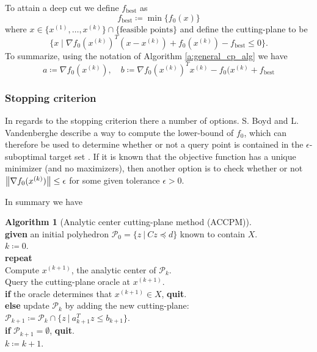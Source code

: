 \documentclass[11pt]{amsart}
\theoremstyle{definition}
\newtheorem{algorithm}{Algorithm}
\theoremstyle{remark}
\newcommand{\ind}{\hspace*{0.5cm}}
\newcommand{\transpose}{T}
\begin{document}
        To attain a deep cut we define $f_\text{best}$ as
        \begin{equation*}
            f_\text{best} \coloneqq \min \{f_0(x)\}
        \end{equation*}
        where $x \in \{x^{(1)}, \dots, x^{(k)}\} \cap \{\text{feasible points}\}$ and define the cutting-plane to be
        \begin{equation*}
            \{x \;|\; \nabla f_0(x^{(k)})^\transpose(x-x^{(k)}) + f_0(x^{(k)}) - f_\text{best} \leq 0\}.
        \end{equation*}
        To summarize, using the notation of Algorithm \ref{a:general_cp_alg} we have
        \begin{equation}
            a \coloneqq \nabla f_0(x^{(k)}), \quad b \coloneqq \nabla f_0(x^{(k)})^\transpose x^{(k)} - f_0(x^{(k)} + f_\text{best}
        \end{equation}

        \subsubsection*{Stopping criterion}
        In regards to the stopping criterion there a number of options. S. Boyd and L. Vandenberghe describe a way to compute the lower-bound of $f_0$, which can therefore be used to determine whether or not a query point is contained in the $\epsilon$-suboptimal target set \cite[Section 7]{BV11}. If it is known that the objective function has a unique minimizer (and no maximizers), then another option is to check whether or not $\norm{\nabla f_0(x^{(k)})} \leq \epsilon$ for some given tolerance $\epsilon > 0$. 

        In summary we have
        \begin{algorithm}[Analytic center cutting-plane method (ACCPM)]
        \label{a:accpm}\mbox{}\\
            \ind \textbf{given} an initial polyhedron $\mathcal{P}_0 = \{z \:|\: Cz \preceq d\}$ known to contain $X$. \\
            \ind $k \coloneqq 0$. \\
            \ind \textbf{repeat} \\
            \ind\ind Compute $x^{(k+1)}$, the analytic center of $\mathcal{P}_k$. \\
            \ind\ind Query the cutting-plane oracle at $x^{(k+1)}$. \\
            \ind\ind \textbf{if} the oracle determines that $x^{(k+1)} \in X$, \textbf{quit}. \\
            \ind\ind \textbf{else} update $\mathcal{P}_k$ by adding the new cutting-plane: \\
            \ind\ind\ind $\mathcal{P}_{k+1} \coloneqq \mathcal{P}_k \cap \{z \:|\: a_{k+1}^\transpose z \leq b_{k+1} \}$. \\
            \ind\ind \textbf{if} $\mathcal{P}_{k+1} = \emptyset$, \textbf{quit}. \\
            \ind\ind $k \coloneqq k+1$.
        \end{algorithm}
\end{document}
